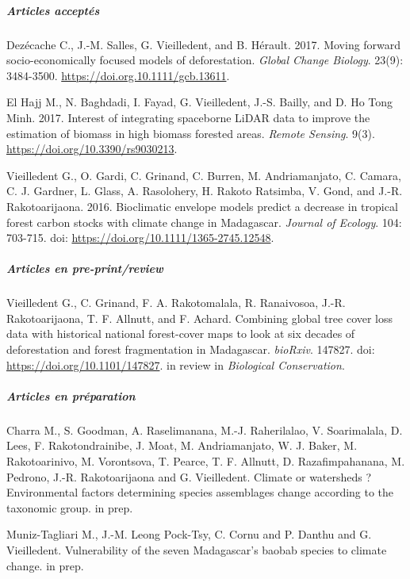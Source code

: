 \documentclass[12pt,]{article}
\let\oldsubparagraph\subparagraph
\renewcommand{\subparagraph}[1]{\oldsubparagraph{#1}\mbox{}}
\begin{document}
\hypertarget{articles-acceptes}{%
\subparagraph{\texorpdfstring{\emph{Articles
acceptés}}{Articles acceptés}}\label{articles-acceptes}}

Dezécache C., J.-M. Salles, G. Vieilledent, and B. Hérault. 2017. Moving
forward socio-economically focused models of deforestation. \emph{Global
Change Biology}. 23(9): 3484-3500.
\url{https://doi.org.10.1111/gcb.13611}.

El Hajj M., N. Baghdadi, I. Fayad, G. Vieilledent, J.-S. Bailly, and D.
Ho Tong Minh. 2017. Interest of integrating spaceborne LiDAR data to
improve the estimation of biomass in high biomass forested areas.
\emph{Remote Sensing}. 9(3). \url{https://doi.org/10.3390/rs9030213}.

Vieilledent G., O. Gardi, C. Grinand, C. Burren, M. Andriamanjato, C.
Camara, C. J. Gardner, L. Glass, A. Rasolohery, H. Rakoto Ratsimba, V.
Gond, and J.-R. Rakotoarijaona. 2016. Bioclimatic envelope models
predict a decrease in tropical forest carbon stocks with climate change
in Madagascar. \emph{Journal of Ecology}. 104: 703-715. doi:
\url{https://doi.org/10.1111/1365-2745.12548}.

\hypertarget{articles-en-pre-printreview}{%
\subparagraph{\texorpdfstring{\emph{Articles en
pre-print/review}}{Articles en pre-print/review}}\label{articles-en-pre-printreview}}

Vieilledent G., C. Grinand, F. A. Rakotomalala, R. Ranaivosoa, J.-R.
Rakotoarijaona, T. F. Allnutt, and F. Achard. Combining global tree
cover loss data with historical national forest-cover maps to look at
six decades of deforestation and forest fragmentation in Madagascar.
\emph{bioRxiv}. 147827. doi: \url{https://doi.org/10.1101/147827}. in
review in \emph{Biological Conservation}.

\hypertarget{articles-en-preparation}{%
\subparagraph{\texorpdfstring{\emph{Articles en
préparation}}{Articles en préparation}}\label{articles-en-preparation}}

Charra M., S. Goodman, A. Raselimanana, M.-J. Raherilalao, V.
Soarimalala, D. Lees, F. Rakotondrainibe, J. Moat, M. Andriamanjato, W.
J. Baker, M. Rakotoarinivo, M. Vorontsova, T. Pearce, T. F. Allnutt, D.
Razafimpahanana, M. Pedrono, J.-R. Rakotoarijaona and G. Vieilledent.
Climate or watersheds ? Environmental factors determining species
assemblages change according to the taxonomic group. in prep.

Muniz-Tagliari M., J.-M. Leong Pock-Tsy, C. Cornu and P. Danthu and G.
Vieilledent. Vulnerability of the seven Madagascar's baobab species to
climate change. in prep.
\end{document}
